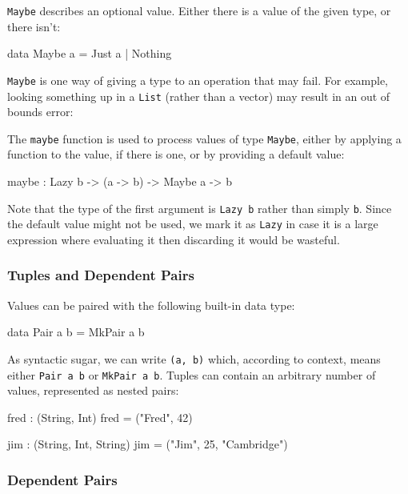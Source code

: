 \texttt{Maybe} describes an optional value.
Either there is a value of the given type, or there isn't:

\begin{code}
data Maybe a = Just a | Nothing
\end{code}


\noindent
\texttt{Maybe} is one way of giving a type to an operation that may fail.
For example, looking something up in a \texttt{List} (rather than a vector) may result in an out of bounds error:


\noindent
The \texttt{maybe} function is used to process values of type \texttt{Maybe}, either by applying a function to the value, if there is one, or by providing a default value:

\begin{code}
maybe : Lazy b -> (a -> b) -> Maybe a -> b
\end{code}

\noindent
Note that the type of the first argument is \texttt{Lazy b} rather than simply \texttt{b}.
Since the default value might not be used, we mark it as \texttt{Lazy} in case it is a large expression where evaluating it then discarding it would be wasteful.

\subsubsection{Tuples and Dependent Pairs}

Values can be paired with the following built-in data type:

\begin{code}
data Pair a b = MkPair a b
\end{code}


\noindent
As syntactic sugar, we can write \texttt{(a, b)} which, according to context, means either \texttt{Pair a b} or \texttt{MkPair a b}.
Tuples can contain an arbitrary number of values, represented as nested pairs:

\begin{code}
fred : (String, Int)
fred = ("Fred", 42)

jim : (String, Int, String)
jim = ("Jim", 25, "Cambridge")
\end{code}


\subsubsection*{Dependent Pairs}

